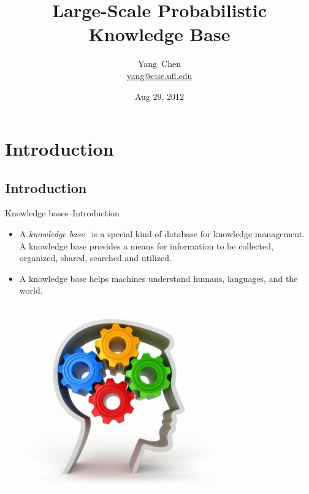 \documentclass[onlymath,xcolor=pdftex,dvipsnames,table]{beamer}
\title[COP3275]%
{\probkb Large-Scale Probabilistic Knowledge Base}
\author %
{Yang~Chen\\{\footnotesize\url{yang@cise.ufl.edu}}}
\institute[University of Florida] %
{
  Computer and Information Science and Engineering\\
  University of Florida\\
}
\date{Aug 29, 2012} %
\let\oldemph\emph
\renewcommand{\emph}[1]{{\color{Blue}\oldemph{#1}}}
\begin{document}
{\setbeamertemplate{background canvas}{%
\frame{\titlepage}}}
\maketitle


\section{Introduction}
\subsection{Introduction}
\begin{frame}{Knowledge bases--Introduction}
\begin{itemize}
  \item A \emph{knowledge base}~\cite{nath2010efficient} is a special kind of database for knowledge management.
A knowledge base provides a means for information to be collected, organized,
shared, searched and utilized.
  \item A knowledge base helps machines understand humans, languages, and the world.
\end{itemize}
\begin{figure}
  \centering
  \includegraphics[width=.3\textwidth]{knowledgeBase.jpg}
\end{figure}
\end{frame}
\end{document}
